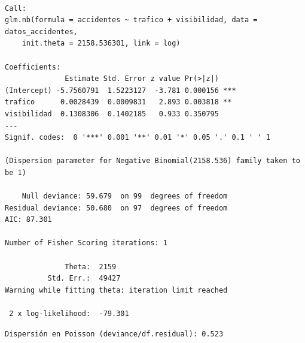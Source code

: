 \documentclass[
  letterpaper,
  DIV=11,
  numbers=noendperiod]{scrreprt}
\newenvironment{Shaded}{\begin{snugshade}}{\end{snugshade}}
\newcommand{\CommentTok}[1]{\textcolor[rgb]{0.37,0.37,0.37}{#1}}
\newcommand{\DecValTok}[1]{\textcolor[rgb]{0.68,0.00,0.00}{#1}}
\newcommand{\FunctionTok}[1]{\textcolor[rgb]{0.28,0.35,0.67}{#1}}
\newcommand{\NormalTok}[1]{\textcolor[rgb]{0.00,0.23,0.31}{#1}}
\newcommand{\SpecialCharTok}[1]{\textcolor[rgb]{0.37,0.37,0.37}{#1}}
\newcommand{\StringTok}[1]{\textcolor[rgb]{0.13,0.47,0.30}{#1}}
\begin{document}
\begin{tcolorbox}
\begin{verbatim}

Call:
glm.nb(formula = accidentes ~ trafico + visibilidad, data = datos_accidentes, 
    init.theta = 2158.536301, link = log)

Coefficients:
              Estimate Std. Error z value Pr(>|z|)    
(Intercept) -5.7560791  1.5223127  -3.781 0.000156 ***
trafico      0.0028439  0.0009831   2.893 0.003818 ** 
visibilidad  0.1308306  0.1402185   0.933 0.350795    
---
Signif. codes:  0 '***' 0.001 '**' 0.01 '*' 0.05 '.' 0.1 ' ' 1

(Dispersion parameter for Negative Binomial(2158.536) family taken to be 1)

    Null deviance: 59.679  on 99  degrees of freedom
Residual deviance: 50.680  on 97  degrees of freedom
AIC: 87.301

Number of Fisher Scoring iterations: 1

              Theta:  2159 
          Std. Err.:  49427 
Warning while fitting theta: iteration limit reached 

 2 x log-likelihood:  -79.301 
\end{verbatim}

\begin{Shaded}
\end{Shaded}

\begin{verbatim}
Dispersión en Poisson (deviance/df.residual): 0.523 
\end{verbatim}

\begin{Shaded}
\end{Shaded}


\end{tcolorbox}
\end{document}
